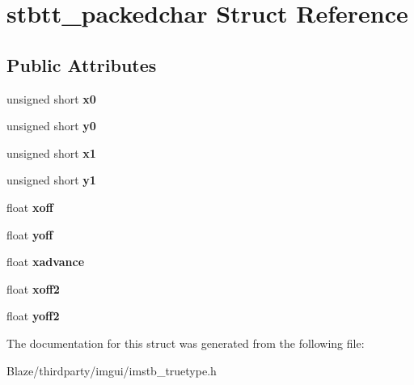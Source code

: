 \hypertarget{structstbtt__packedchar}{}\section{stbtt\+\_\+packedchar Struct Reference}
\label{structstbtt__packedchar}
\subsection*{Public Attributes}
\begin{DoxyCompactItemize}
\item 
\mbox{\label{structstbtt__packedchar_a02cb73a5af37ed60dafd5e4b731af09e}} 
unsigned short {\bfseries x0}
\item 
\mbox{\label{structstbtt__packedchar_a43429c9545ca8ccf14012cedcf83c1a7}} 
unsigned short {\bfseries y0}
\item 
\mbox{\label{structstbtt__packedchar_a99d371f0261cd13dfd1a179f143175d1}} 
unsigned short {\bfseries x1}
\item 
\mbox{\label{structstbtt__packedchar_a9569073ba79fad355210b6ffc35905a7}} 
unsigned short {\bfseries y1}
\item 
\mbox{\label{structstbtt__packedchar_adb30c50674c79d32116ae6f94bd5893f}} 
float {\bfseries xoff}
\item 
\mbox{\label{structstbtt__packedchar_a6f342ae10df5319f4999ffd256567142}} 
float {\bfseries yoff}
\item 
\mbox{\label{structstbtt__packedchar_a28707ae98d1fa946b3390840aeff76ab}} 
float {\bfseries xadvance}
\item 
\mbox{\label{structstbtt__packedchar_a3a33880f925ca826c908cbf9f0673c9f}} 
float {\bfseries xoff2}
\item 
\mbox{\label{structstbtt__packedchar_a2ec5bbd1010c9a9b7cbdeb7503dcaffa}} 
float {\bfseries yoff2}
\end{DoxyCompactItemize}


The documentation for this struct was generated from the following file\+:\begin{DoxyCompactItemize}
\item 
Blaze/thirdparty/imgui/imstb\+\_\+truetype.\+h\end{DoxyCompactItemize}
